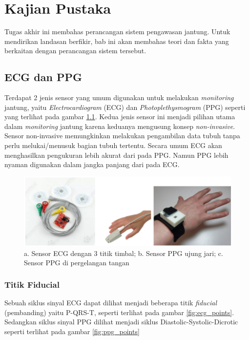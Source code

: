\chapter{Kajian Pustaka}
Tugas akhir ini membahas perancangan sistem pengawasan jantung. Untuk mendirikan landasan berfikir, bab ini akan membahas teori dan fakta yang berkaitan dengan perancangan sistem tersebut.

\section{ECG dan PPG}
Terdapat 2 jenis sensor yang umum digunakan untuk melakukan \textit{monitoring} jantung, yaitu \textit{Electrocardiogram} (ECG) dan \textit{Photoplethysmogram} (PPG) seperti yang terlihat pada gambar \ref{fig:ecg_n_ppg}. Kedua jenis sensor ini menjadi pilihan utama dalam \textit{monitoring} jantung karena keduanya mengusung konsep \textit{non-invasive}. Sensor non-invasive memungkinkan melakukan pengambilan data tubuh tanpa perlu melukai/menusuk bagian tubuh tertentu. Secara umum ECG akan menghasilkan pengukuran lebih akurat dari pada PPG. Namun PPG lebih nyaman digunakan dalam jangka panjang dari pada ECG.

\begin{figure}[h!]
    \centering
    \includegraphics[scale=0.3]{images/sensors.png}
    \caption{a. Sensor ECG dengan 3 titik timbal; b. Sensor PPG ujung jari; c. Sensor PPG di pergelangan tangan}
    \label{fig:ecg_n_ppg}
\end{figure}

\subsection{Titik Fiducial}
Sebuah siklus sinyal ECG dapat dilihat menjadi beberapa titik \textit{fiducial} (pembanding) yaitu P-QRS-T, seperti terlihat pada gambar \ref{fig:ecg_points}. Sedangkan siklus sinyal PPG dilihat menjadi siklus Diastolic-Systolic-Dicrotic seperti terlihat pada gambar \ref{fig:ppg_points}

